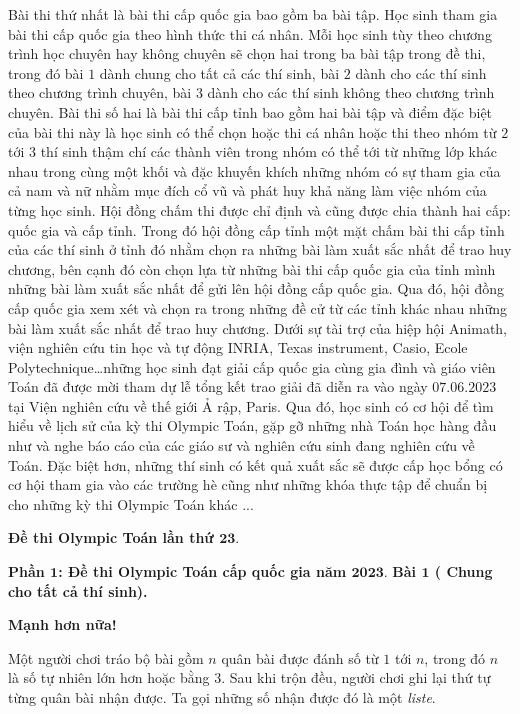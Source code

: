 \begin{multicols}{2}
\begin{figure}[H]
		\vspace*{-15pt}
	\end{figure}
	Bài thi thứ nhất là bài thi cấp quốc gia bao gồm ba bài tập. Học sinh tham gia bài thi cấp quốc gia theo hình thức thi cá nhân. Mỗi học sinh tùy theo chương trình học chuyên hay không chuyên sẽ chọn hai trong ba bài tập trong đề thi, trong đó bài $1$ dành chung cho tất cả các thí sinh, bài $2$ dành cho các thí sinh theo chương trình chuyên, bài $3$ dành cho các thí sinh không theo chương trình chuyên. 
	\vskip 0.1cm
	Bài thi số hai là bài thi cấp tỉnh bao gồm hai bài tập và điểm đặc biệt của bài thi này là học sinh có thể chọn hoặc thi cá nhân hoặc thi theo nhóm từ $2$ tới $3$ thí sinh thậm chí các thành viên trong nhóm có thể tới từ những lớp khác nhau trong cùng một khối và đặc khuyến khích những nhóm có sự tham gia của cả nam và nữ nhằm mục đích cổ vũ và phát huy khả năng làm việc nhóm của từng học sinh. 
	\vskip 0.1cm
	Hội đồng chấm thi được chỉ định và cũng được chia thành hai cấp: quốc gia và cấp tỉnh. Trong đó hội đồng cấp tỉnh một mặt chấm bài thi cấp tỉnh của các thí sinh ở tỉnh đó nhằm chọn ra những bài làm xuất sắc nhất để trao huy chương, bên cạnh đó còn chọn lựa từ những bài thi cấp quốc gia của tỉnh mình những bài làm xuất sắc nhất để gửi lên hội đồng cấp quốc gia. Qua đó, hội đồng cấp quốc gia xem xét và chọn ra trong những đề cử từ các tỉnh khác nhau những bài làm xuất sắc nhất để trao huy chương. 
	\vskip 0.1cm
	Dưới sự tài trợ của hiệp hội Animath, viện nghiên cứu tin học và tự động  INRIA, Texas instrument, Casio, Ecole Polytechnique…những học sinh đạt giải cấp quốc gia cùng gia đình và giáo viên Toán đã được mời tham dự lễ tổng kết trao giải đã diễn ra vào ngày $07.06.2023$ tại Viện nghiên cứu về thế giới Ả rập, Paris. Qua đó, học sinh có cơ hội để tìm hiểu về lịch sử của kỳ thi Olympic Toán, gặp gỡ những nhà Toán học hàng đầu như và nghe báo cáo của các giáo sư và nghiên cứu sinh đang nghiên cứu về Toán. Đặc biệt hơn, những thí sinh có kết quả xuất sắc sẽ được cấp học bổng có cơ hội tham gia vào các trường hè cũng như những khóa thực tập để chuẩn bị cho những kỳ thi Olympic Toán khác ...
	\vskip 0.1cm
	\centerline{\textbf{\color{cackithi}Đề thi Olympic Toán lần thứ $\pmb{23.}$}}
	\vskip 0.1cm
	 \textbf{\color{cackithi}Phần $\pmb{1}$: Đề thi Olympic Toán cấp quốc gia năm $\pmb{2023.}$}
	\vskip 0.1cm
	 \textbf{\color{cackithi}Bài $\pmb{1}$ ( Chung cho tất cả thí sinh).}
	\vskip 0.1cm 
	\centerline{ \textbf{\color{cackithi}Mạnh hơn nữa!}}
	\vskip 0.1cm
	Một người chơi tráo bộ bài gồm $n$ quân bài được đánh số từ $1$ tới $n$, trong đó $n$ là số tự nhiên lớn hơn hoặc bằng $3$. Sau khi trộn đều, người chơi ghi lại thứ tự từng quân bài nhận được. Ta gọi những số nhận được đó là một \textit{liste}.

\end{multicols}
